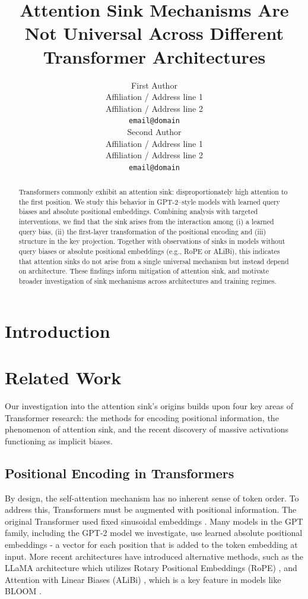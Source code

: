 \documentclass[11pt]{article}
\title{Attention Sink Mechanisms Are Not Universal Across Different Transformer Architectures}
\author{First Author \\
  Affiliation / Address line 1 \\
  Affiliation / Address line 2 \\
  \texttt{email@domain} \\\And
  Second Author \\
  Affiliation / Address line 1 \\
  Affiliation / Address line 2 \\
  \texttt{email@domain} \\
}
\date{}
\newif\ifYRMcomments
\newcommand{\YRM}[1]{\ifYRMcomments\textcolor{red}{[YRM: #1]}\fi}
\begin{document}
\maketitle

\begin{abstract}
  Transformers commonly exhibit an attention sink: disproportionately high attention to the first position. We study this behavior in GPT-2–style models with learned query biases and absolute positional embeddings. Combining analysis with targeted interventions, we find that the sink arises from the interaction among (i) a learned query bias, (ii) the first-layer transformation of the positional encoding and (iii) structure in the key projection. Together with observations of sinks in models without query biases or absolute positional embeddings (e.g., RoPE or ALiBi), this indicates that attention sinks do not arise from a single universal mechanism but instead depend on architecture. These findings inform mitigation of attention sink, and motivate broader investigation of sink mechanisms across architectures and training regimes.
\end{abstract}

\section{Introduction}


\section{Related Work}
\YRM{I didn't look at this part yet, waiting for you to finish it fist :) } 

\YRM{As mentioned, this needs to be improved - By citing more, making this more concise (as concise as possible while including really vital info, and adding more in appendix if needed, like we did in our attention knockout paper )}Our investigation into the attention sink's origins builds upon four key areas of Transformer research: the methods for encoding positional information, the phenomenon of attention sink, and the recent discovery of massive activations functioning as implicit biases.

\subsection{Positional Encoding in Transformers}
By design, the self-attention mechanism has no inherent sense of token order. To address this, Transformers must be augmented with positional information. The original Transformer used fixed sinusoidal embeddings \cite{vaswani2017attention}. Many models in the GPT family, including the GPT-2 model we investigate, use learned absolute positional embeddings - a vector for each position that is added to the token embedding at input. More recent architectures have introduced alternative methods, such as the LLaMA architecture \cite{touvron2023llama2} which utilizes Rotary Positional Embeddings (RoPE) \cite{su2021roformer}, and Attention with Linear Biases (ALiBi) \cite{press2021train}, which is a key feature in models like BLOOM \cite{bigscience2023bloom}.
\end{document}
